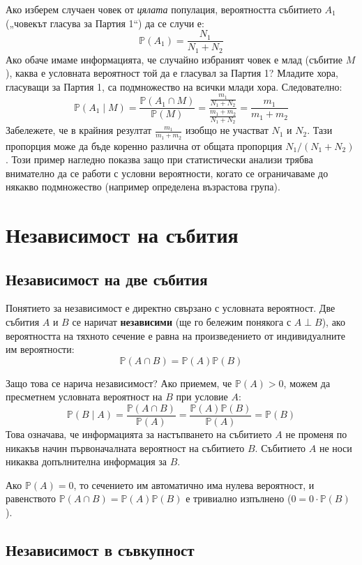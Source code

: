 \documentclass{article}
\begin{document}
Ако изберем случаен човек от \textit{цялата} популация, вероятността събитието $A_1$ („човекът гласува за Партия 1“) да се случи е:
\[
\mathbb{P}(A_1) = \frac{N_1}{N_1 + N_2}
\]
Ако обаче имаме информацията, че случайно избраният човек е млад (събитие $M$), каква е условната вероятност той да е гласувал за Партия 1?
Младите хора, гласуващи за Партия 1, са подмножество на всички млади хора. Следователно:
\[
\mathbb{P}(A_1 \mid M) = \frac{\mathbb{P}(A_1 \cap M)}{\mathbb{P}(M)} = \frac{\frac{m_1}{N_1 + N_2}}{\frac{m_1 + m_2}{N_1 + N_2}} = \frac{m_1}{m_1 + m_2}
\]
Забележете, че в крайния резултат $\frac{m_1}{m_1 + m_2}$ изобщо не участват $N_1$ и $N_2$. Тази пропорция може да бъде коренно различна от общата пропорция $N_1 / (N_1 + N_2)$. Този пример нагледно показва защо при статистически анализи трябва внимателно да се работи с условни вероятности, когато се ограничаваме до някакво подмножество (например определена възрастова група).

\section{Независимост на събития}

\subsection{Независимост на две събития}

Понятието за независимост е директно свързано с условната вероятност. 
Две събития $A$ и $B$ се наричат \textbf{независими} (ще го бележим понякога с $A \perp B$), ако вероятността на тяхното сечение е равна на произведението от индивидуалните им вероятности:
\[
\mathbb{P}(A \cap B) = \mathbb{P}(A)\mathbb{P}(B)
\]

Защо това се нарича независимост? Ако приемем, че $\mathbb{P}(A) > 0$, можем да пресметнем условната вероятност на $B$ при условие $A$:
\[
\mathbb{P}(B \mid A) = \frac{\mathbb{P}(A \cap B)}{\mathbb{P}(A)} = \frac{\mathbb{P}(A)\mathbb{P}(B)}{\mathbb{P}(A)} = \mathbb{P}(B)
\]
Това означава, че информацията за настъпването на събитието $A$ не променя по никакъв начин първоначалната вероятност на събитието $B$. Събитието $A$ не носи никаква допълнителна информация за $B$. 

Ако $\mathbb{P}(A) = 0$, то сечението им автоматично има нулева вероятност, и равенството $\mathbb{P}(A \cap B) = \mathbb{P}(A)\mathbb{P}(B)$ е тривиално изпълнено ($0 = 0 \cdot \mathbb{P}(B)$).

\subsection{Независимост в съвкупност}
\end{document}
